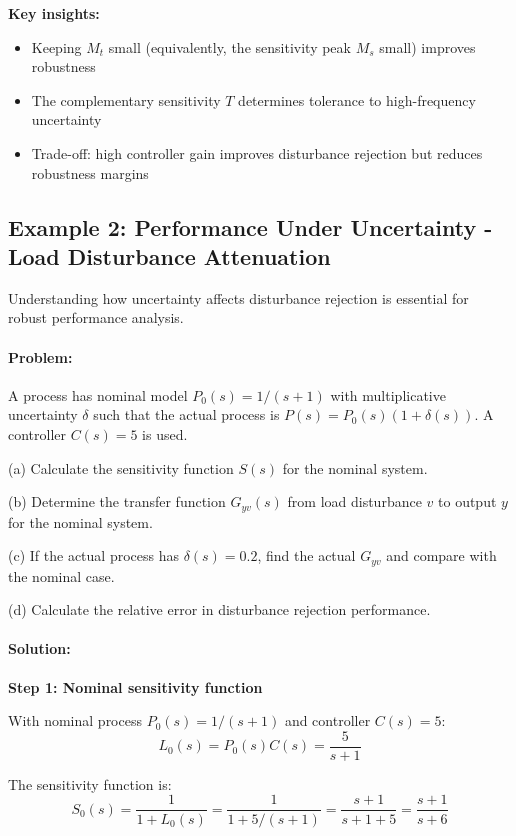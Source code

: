 \documentclass[11pt,a4paper]{article}
\begin{document}
\textbf{Key insights:}
\begin{itemize}
  \item Keeping $M_t$ small (equivalently, the sensitivity peak $M_s$ small) improves robustness
  \item The complementary sensitivity $T$ determines tolerance to high-frequency uncertainty
  \item Trade-off: high controller gain improves disturbance rejection but reduces robustness margins
\end{itemize}

\subsection{Example 2: Performance Under Uncertainty - Load Disturbance Attenuation}

Understanding how uncertainty affects disturbance rejection is essential for robust performance analysis.

\paragraph{Problem:}
A process has nominal model $P_0(s) = 1/(s+1)$ with multiplicative uncertainty $\delta$ such that the actual process is $P(s) = P_0(s)(1+\delta(s))$. A controller $C(s) = 5$ is used.

(a) Calculate the sensitivity function $S(s)$ for the nominal system.

(b) Determine the transfer function $G_{yv}(s)$ from load disturbance $v$ to output $y$ for the nominal system.

(c) If the actual process has $\delta(s) = 0.2$, find the actual $G_{yv}$ and compare with the nominal case.

(d) Calculate the relative error in disturbance rejection performance.

\paragraph{Solution:}

\textbf{Step 1: Nominal sensitivity function}

With nominal process $P_0(s) = 1/(s+1)$ and controller $C(s) = 5$:
\begin{equation}
  L_0(s) = P_0(s)C(s) = \frac{5}{s+1}
\end{equation}

The sensitivity function is:
\begin{equation}
  S_0(s) = \frac{1}{1 + L_0(s)} = \frac{1}{1 + 5/(s+1)} = \frac{s+1}{s+1+5} = \frac{s+1}{s+6}
\end{equation}
\end{document}
